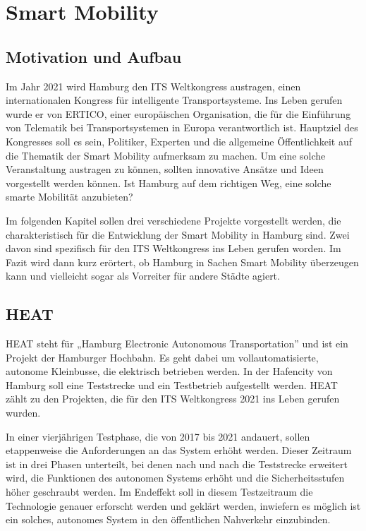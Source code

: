 \section{Smart Mobility}
\label{sec:smart_mobility}

\subsection{Motivation und Aufbau}

Im Jahr 2021 wird Hamburg den ITS Weltkongress austragen, einen internationalen Kongress für intelligente Transportsysteme.
Ins Leben gerufen wurde er von ERTICO, einer europäischen Organisation, die für die Einführung von Telematik bei Transportsystemen in Europa verantwortlich ist.
Hauptziel des Kongresses soll es sein, Politiker, Experten und die allgemeine Öffentlichkeit auf die Thematik der Smart Mobility aufmerksam zu machen.
Um eine solche Veranstaltung austragen zu können, sollten innovative Ansätze und Ideen vorgestellt werden können.
Ist Hamburg auf dem richtigen Weg, eine solche smarte Mobilität anzubieten? \autocite[vgl.][]{ITSWorldCongress.2020}

Im folgenden Kapitel sollen drei verschiedene Projekte vorgestellt werden, die charakteristisch für die Entwicklung der Smart Mobility in Hamburg sind.
Zwei davon sind spezifisch für den ITS Weltkongress ins Leben gerufen worden.
Im Fazit wird dann kurz erörtert, ob Hamburg in Sachen Smart Mobility überzeugen kann und vielleicht sogar als Vorreiter für andere Städte agiert. 

\subsection{HEAT}

HEAT steht für „Hamburg Electronic Autonomous Transportation” und ist ein Projekt der Hamburger Hochbahn.
Es geht dabei um vollautomatisierte, autonome Kleinbusse, die elektrisch betrieben werden. In der Hafencity von Hamburg soll eine Teststrecke und ein Testbetrieb aufgestellt werden. HEAT zählt zu den Projekten, die für den ITS Weltkongress 2021 ins Leben gerufen wurden. \autocite[vgl.][]{SmartCityKompass.2020c}

In einer vierjährigen Testphase, die von 2017 bis 2021 andauert, sollen etappenweise die Anforderungen an das System erhöht werden.
Dieser Zeitraum ist in drei Phasen unterteilt, bei denen nach und nach die Teststrecke erweitert wird, die Funktionen des autonomen Systems erhöht und die Sicherheitsstufen höher geschraubt werden.
Im Endeffekt soll in diesem Testzeitraum die Technologie genauer erforscht werden und geklärt werden, inwiefern es möglich ist ein solches, autonomes System in den öffentlichen Nahverkehr einzubinden. \autocite[vgl.][]{HOCHBAHN.2020}


